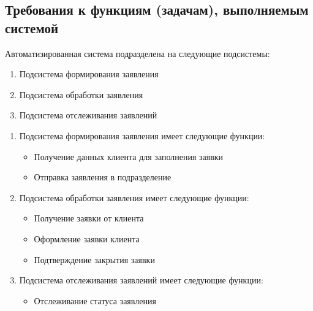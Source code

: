 \documentclass[russian, utf8, 12pt,pointsubsection,floatsubsection]{eskdtext}
\begin{document}
\subsection{Требования к функциям (задачам), выполняемым системой}

Автоматизированная система подразделена на следующие подсистемы:
\begin{enumerate}
    \item Подсистема формирования заявления
    \item Подсистема обработки заявления
    \item Подсистема отслеживания заявлений
\end{enumerate}

\begin{enumerate}
    \item Подсистема формирования заявления имеет следующие функции:
    \begin{itemize}
        \item Получение данных клиента для заполнения заявки
        \item Отправка заявления в подразделение
    \end{itemize}
    \item Подсистема обработки заявления имеет следующие функции:
    \begin{itemize}
        \item Получение заявки от клиента
        \item Оформление заявки клиента
        \item Подтверждение закрытия заявки
    \end{itemize}
    \item Подсистема отслеживания заявлений имеет следующие функции:
    \begin{itemize}
        \item Отслеживание статуса заявления
    \end{itemize}
\end{enumerate}
\end{document}
